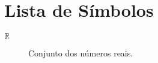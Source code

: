 \chapter*{Lista de Símbolos}

\begin{description}
    \item[$\mathbb{R}$] \quad Conjunto dos números reais.
\end{description}
